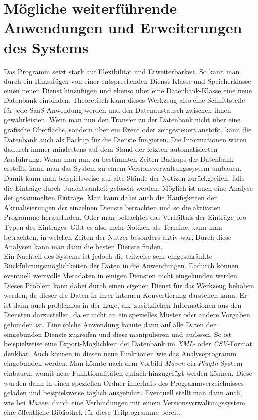 \section{Mögliche weiterführende Anwendungen und Erweiterungen des Systems}
Das Programm setzt stark auf Flexibilität und Erweiterbarkeit. So kann man durch ein Hinzufügen von einer entsprechenden Dienst-Klasse und Speicherklasse einen neuen Dienst hinzufügen und ebenso über eine Datenbank-Klasse eine neue Datenbank einbinden. Theoretisch kann dieses Werkzeug also eine Schnittstelle für jede SaaS-Anwendung werden und den Datenaustausch zwischen ihnen gewährleisten. Wenn man nun den Transfer zu der Datenbank nicht über eine grafische Oberfläche, sondern über ein Event oder zeitgesteuert anstößt, kann die Datenbank auch als Backup für die Dienste fungieren. Die Informationen wären dadurch immer mindestens auf dem Stand der letzten automatisierten Ausführung. Wenn man nun zu bestimmten Zeiten Backups der Datenbank erstellt, kann man das System zu einem Versionsverwaltungssystem umbauen. Damit kann man beispielsweise auf alte Stände der Notizen zurückgreifen, falls die Einträge durch Unachtsamkeit gelöscht werden.
Möglich ist auch eine Analyse der gesammelten Einträge. Man kann dabei auch die Häufigkeiten der Aktualisierungen der einzelnen Dienste betrachten und so die aktivsten Programme herausfinden. Oder man betrachtet das Verhältnis der Einträge pro Typen des Eintrages. Gibt es also mehr Notizen als Termine, kann man betrachten, in welchen Zeiten der Nutzer besonders aktiv war. Durch diese Analysen kann man dann die besten Dienste finden. \\
Ein Nachteil des Systems ist jedoch die teilweise sehr eingeschränkte Rückführungsmöglichkeiten der Daten in die Anwendungen. Dadurch können eventuell wertvolle Metadaten in einigen Diensten nicht eingebunden werden. Dieses Problem kann dabei durch einen eigenen Dienst für das Werkzeug behoben werden, da dieser die Daten in ihrer internen Konvertierung darstellen kann. Er ist dann auch problemlos in der Lage, alle zusätzlichen Informationen aus den Diensten darzustellen, da er nicht an ein spezielles Muster oder andere Vorgaben gebunden ist. Eine solche Anwendung könnte dann auf alle Daten der eingebunden Dienste zugreifen und diese manipulieren und auslesen. So ist beispielweise eine Export-Möglichkeit der Datenbank im \textit{XML-} oder \textit{CSV}-Format denkbar. Auch können in diesen neue Funktionen wie das Analyseprogramm eingebunden werden. Man könnte nach dem Vorbild \textit{Maven} ein \textit{PlugIn}-System einbauen, womit neue Funktionalitäten einfach hinzugefügt werden können. Diese wurden dann in einen speziellen Ordner innerhalb des Programmverzeichnisses geladen und beispielsweise täglich ausgeführt. Eventuell stellt man dann auch, wie bei \textit{Maven}, durch eine Verbindungen mit einem Versionsverwaltungssystem eine öffentliche Bibliothek für diese Teilprogramme bereit.\\